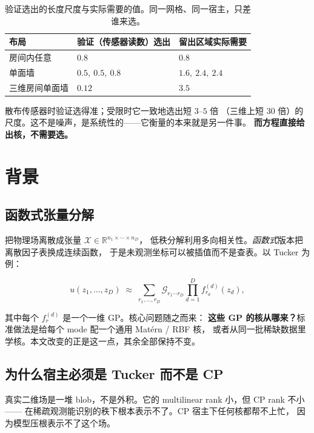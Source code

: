 \documentclass[11pt,a4paper]{article}
\begin{document}
\begin{table}[t]
\centering
\caption{验证选出的长度尺度与实际需要的值。同一网格、同一宿主，只差谁来选。}
\label{tab:tuning}
\begin{tabular}{lll}
\toprule
布局 & 验证（传感器读数）选出 & 留出区域实际需要 \\
\midrule
房间内任意 & $0.8$ & $0.8$ \\
单面墙 & $0.5,\ 0.5,\ 0.8$ & $\mathbf{1.6,\ 2.4,\ 2.4}$ \\
三维房间单面墙 & $0.12$ & $\mathbf{3.5}$ \\
\bottomrule
\end{tabular}
\end{table}

散布传感器时验证选得准；受限时它一致地选出短 $3$--$5$ 倍
（三维上短 $30$ 倍）的尺度。这不是噪声，是系统性的——它衡量的本来就是另一件事。
\textbf{而方程直接给出核，不需要选。}

\section{背景}

\subsection{函数式张量分解}

把物理场离散成张量 $\mathcal{X} \in \mathbb{R}^{n_1 \times \cdots \times n_D}$，
低秩分解利用多向相关性。\emph{函数式}版本把离散因子表换成连续函数，
于是未观测坐标可以被插值而不是查表。以 Tucker 为例：

\begin{equation}
u(z_1, \dots, z_D) \;\approx\; \sum_{r_1, \dots, r_D}
  \mathcal{G}_{r_1 \cdots r_D} \prod_{d=1}^{D} f^{(d)}_{r_d}(z_d),
\label{eq:tucker}
\end{equation}

其中每个 $f^{(d)}_{r}$ 是一个一维 GP。核心问题随之而来：
\textbf{这些 GP 的核从哪来？}标准做法是给每个 mode 配一个通用 Matérn / RBF 核，
或者从同一批稀缺数据里学核。本文改变的正是这一点，其余全部保持不变。

\subsection{为什么宿主必须是 Tucker 而不是 CP}

真实二维场是一堆 blob，不是外积。它的 multilinear rank 小，但 CP rank 不小——
在稀疏观测能识别的秩下根本表示不了。CP 宿主下任何核都帮不上忙，
因为模型压根表示不了这个场。
\end{document}
